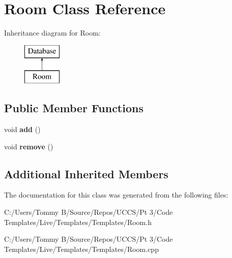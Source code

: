 \hypertarget{class_room}{}\section{Room Class Reference}
\label{class_room}
Inheritance diagram for Room\+:\begin{figure}[H]
\begin{center}
\leavevmode
\includegraphics[height=2.000000cm]{class_room}
\end{center}
\end{figure}
\subsection*{Public Member Functions}
\begin{DoxyCompactItemize}
\item 
\mbox{\label{class_room_af603fb655ef454d8664ade216502000d}} 
void {\bfseries add} ()
\item 
\mbox{\label{class_room_abc70c4d3ce84a2fd28b926bf36c8e13d}} 
void {\bfseries remove} ()
\end{DoxyCompactItemize}
\subsection*{Additional Inherited Members}


The documentation for this class was generated from the following files\+:\begin{DoxyCompactItemize}
\item 
C\+:/\+Users/\+Tommy B/\+Source/\+Repos/\+U\+C\+C\+S/\+Pt 3/\+Code Templates/\+Live/\+Templates/\+Templates/Room.\+h\item 
C\+:/\+Users/\+Tommy B/\+Source/\+Repos/\+U\+C\+C\+S/\+Pt 3/\+Code Templates/\+Live/\+Templates/\+Templates/Room.\+cpp\end{DoxyCompactItemize}
